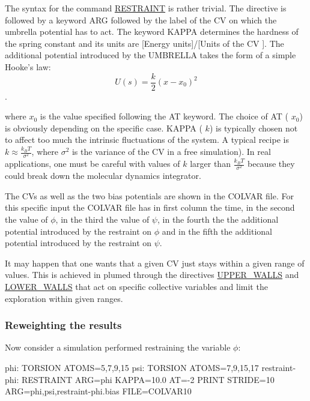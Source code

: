 The syntax for the command \hyperlink{RESTRAINT}{R\+E\+S\+T\+R\+A\+I\+N\+T} is rather trivial. The directive is followed by a keyword A\+R\+G followed by the label of the C\+V on which the umbrella potential has to act. The keyword K\+A\+P\+P\+A determines the hardness of the spring constant and its units are \mbox{[}Energy units\mbox{]}/\mbox{[}Units of the C\+V \mbox{]}. The additional potential introduced by the U\+M\+B\+R\+E\+L\+L\+A takes the form of a simple Hooke’s law\+: \[ U(s)=\frac{k}{2} (x-x_0)^2 \].

where $ x_0 $ is the value specified following the A\+T keyword. The choice of A\+T ( $ x_0 $) is obviously depending on the specific case. K\+A\+P\+P\+A ( $ k $) is typically chosen not to affect too much the intrinsic fluctuations of the system. A typical recipe is $ k \approx \frac{k_BT}{\sigma^2} $, where $ \sigma^2 $ is the variance of the C\+V in a free simulation). In real applications, one must be careful with values of $ k $ larger than $ \frac{k_BT}{\sigma^2} $ because they could break down the molecular dynamics integrator.

The C\+Vs as well as the two bias potentials are shown in the C\+O\+L\+V\+A\+R file. For this specific input the C\+O\+L\+V\+A\+R file has in first column the time, in the second the value of $\phi$, in the third the value of $\psi$, in the fourth the the additional potential introduced by the restraint on $\phi$ and in the fifth the additional potential introduced by the restraint on $\psi$.

It may happen that one wants that a given C\+V just stays within a given range of values. This is achieved in plumed through the directives \hyperlink{UPPER_WALLS}{U\+P\+P\+E\+R\+\_\+\+W\+A\+L\+L\+S} and \hyperlink{LOWER_WALLS}{L\+O\+W\+E\+R\+\_\+\+W\+A\+L\+L\+S} that act on specific collective variables and limit the exploration within given ranges.\hypertarget{belfast-4_belfast-4-reweighting}{}\subsubsection{Reweighting the results}\label{belfast-4_belfast-4-reweighting}
Now consider a simulation performed restraining the variable $\phi $\+: \begin{DoxyVerb}phi: TORSION ATOMS=5,7,9,15
psi: TORSION ATOMS=7,9,15,17
restraint-phi: RESTRAINT ARG=phi KAPPA=10.0 AT=-2
PRINT STRIDE=10 ARG=phi,psi,restraint-phi.bias FILE=COLVAR10\end{DoxyVerb}



